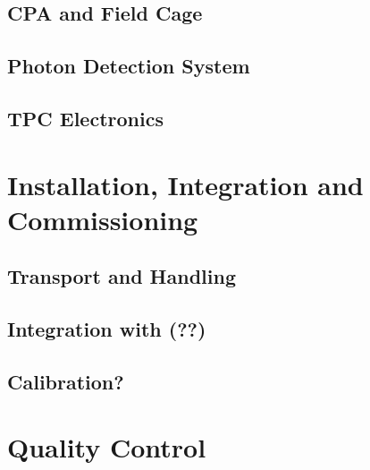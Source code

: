 

\subsection{CPA and Field Cage}
\label{sec:fdsp-hv-intfc-cpa-fc}


\subsection{Photon Detection System}
\label{sec:fdsp-hv-intfc-pds}


\subsection{TPC Electronics}
\label{sec:fdsp-hv-intfc-elec}



\section{Installation, Integration and Commissioning}
\label{sec:fdsp-hv-install}

\subsection{Transport and Handling}
\label{sec:fdsp-hv-install-transport}


\subsection{Integration with (??)}
\label{sec:fdsp-hv-install-pds-elec}


\subsection{Calibration?}
\label{sec:fdsp-hv-install-calib}



\section{Quality Control}
\label{sec:fdsp-hv-qc}

